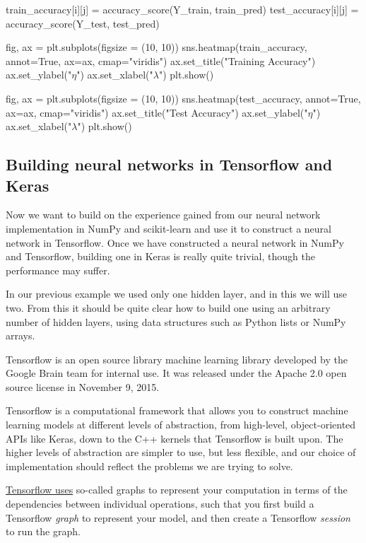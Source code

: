 \documentclass[%
oneside,                 %
final,                   %
10pt]{article}
\begin{document}
        train_accuracy[i][j] = accuracy_score(Y_train, train_pred)
        test_accuracy[i][j] = accuracy_score(Y_test, test_pred)

        
fig, ax = plt.subplots(figsize = (10, 10))
sns.heatmap(train_accuracy, annot=True, ax=ax, cmap="viridis")
ax.set_title("Training Accuracy")
ax.set_ylabel("$\eta$")
ax.set_xlabel("$\lambda$")
plt.show()

fig, ax = plt.subplots(figsize = (10, 10))
sns.heatmap(test_accuracy, annot=True, ax=ax, cmap="viridis")
ax.set_title("Test Accuracy")
ax.set_ylabel("$\eta$")
ax.set_xlabel("$\lambda$")
plt.show()
\epycod



\subsection{Building neural networks in Tensorflow and Keras}

Now we want  to build on the experience gained from our neural network implementation in NumPy and scikit-learn
and use it to construct a neural network in Tensorflow. Once we have constructed a neural network in NumPy
and Tensorflow, building one in Keras is really quite trivial, though the performance may suffer.  

In our previous example we used only one hidden layer, and in this we will use two. From this it should be quite
clear how to build one using an arbitrary number of hidden layers, using data structures such as Python lists or
NumPy arrays.


Tensorflow is an open source library machine learning library
developed by the Google Brain team for internal use. It was released
under the Apache 2.0 open source license in November 9, 2015.

Tensorflow is a computational framework that allows you to construct
machine learning models at different levels of abstraction, from
high-level, object-oriented APIs like Keras, down to the C++ kernels
that Tensorflow is built upon. The higher levels of abstraction are
simpler to use, but less flexible, and our choice of implementation
should reflect the problems we are trying to solve.

\href{{https://www.tensorflow.org/guide/graphs}}{Tensorflow uses} so-called graphs to represent your computation
in terms of the dependencies between individual operations, such that you first build a Tensorflow \emph{graph}
to represent your model, and then create a Tensorflow \emph{session} to run the graph.
\end{document}

